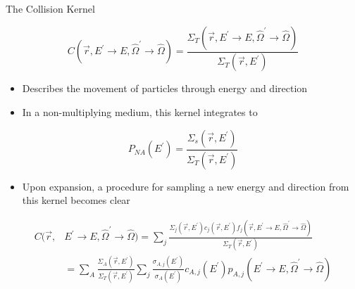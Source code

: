 \documentclass{beamer}
\begin{document}
\begin{frame}{The Collision Kernel}

  \begin{equation*}
    C(\vec{r},E^{'} \to E, \hat{\Omega}^{'} \to \hat{\Omega}) =
    \frac{\Sigma_T(\vec{r},E^{'} \to E,\hat{\Omega}^{'} \to \hat{\Omega})}
         {\Sigma_T(\vec{r},E^{'})}
  \end{equation*}

  \begin{itemize}
    \item Describes the movement of particles through energy and direction
      \medskip
    \item In a non-multiplying medium, this kernel integrates to
  \end{itemize}
  \begin{equation*}
    P_{NA}(E^{'}) = \frac{\Sigma_s(\vec{r},E^{'})}{\Sigma_T(\vec{r},E^{'})} 
  \end{equation*}
  
  \begin{itemize}
    \item Upon expansion, a procedure for sampling a new energy and direction
      from this kernel becomes clear
  \end{itemize}
  \begin{align}
    C(\vec{r},&E^{'} \to E, \hat{\Omega}^{'} \to \hat{\Omega}) =
    \sum_j \frac{\Sigma_j(\vec{r},E^{'})c_j(\vec{r},E^{'})
      f_j(\vec{r},E^{'} \to E,\hat{\Omega}^{'} \to \hat{\Omega})}
        {\Sigma_T(\vec{r},E^{'})} \nonumber \\
      & = \sum_A \frac{\Sigma_A(\vec{r},E^{'})}{\Sigma_T(\vec{r},E^{'})}
        \sum_j \frac{\sigma_{A,j}(E^{'})}{\sigma_A(E^{'})} c_{A,j}(E^{'})
        p_{A,j}(E^{'} \to E,\hat{\Omega}^{'} \to \hat{\Omega}) \nonumber
  \end{align}


\end{frame}
\end{document}

